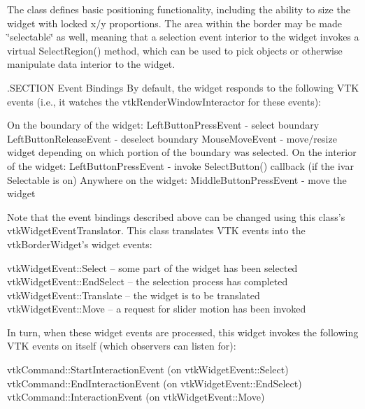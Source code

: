 The class defines basic positioning functionality, including the ability to size the widget with locked x/y proportions. The area within the border may be made \char`\"{}selectable\char`\"{} as well, meaning that a selection event interior to the widget invokes a virtual Select\-Region() method, which can be used to pick objects or otherwise manipulate data interior to the widget.

.S\-E\-C\-T\-I\-O\-N Event Bindings By default, the widget responds to the following V\-T\-K events (i.\-e., it watches the vtk\-Render\-Window\-Interactor for these events)\-: 
\begin{DoxyPre}
 On the boundary of the widget:
   LeftButtonPressEvent - select boundary
   LeftButtonReleaseEvent - deselect boundary
   MouseMoveEvent - move/resize widget depending on which portion of the
                    boundary was selected.
 On the interior of the widget:
   LeftButtonPressEvent - invoke SelectButton() callback (if the ivar
                          Selectable is on)
 Anywhere on the widget:
   MiddleButtonPressEvent - move the widget
 \end{DoxyPre}


Note that the event bindings described above can be changed using this class's vtk\-Widget\-Event\-Translator. This class translates V\-T\-K events into the vtk\-Border\-Widget's widget events\-: 
\begin{DoxyPre}
   vtkWidgetEvent::Select -- some part of the widget has been selected
   vtkWidgetEvent::EndSelect -- the selection process has completed
   vtkWidgetEvent::Translate -- the widget is to be translated
   vtkWidgetEvent::Move -- a request for slider motion has been invoked
 \end{DoxyPre}


In turn, when these widget events are processed, this widget invokes the following V\-T\-K events on itself (which observers can listen for)\-: 
\begin{DoxyPre}
   vtkCommand::StartInteractionEvent (on vtkWidgetEvent::Select)
   vtkCommand::EndInteractionEvent (on vtkWidgetEvent::EndSelect)
   vtkCommand::InteractionEvent (on vtkWidgetEvent::Move)
 \end{DoxyPre}


